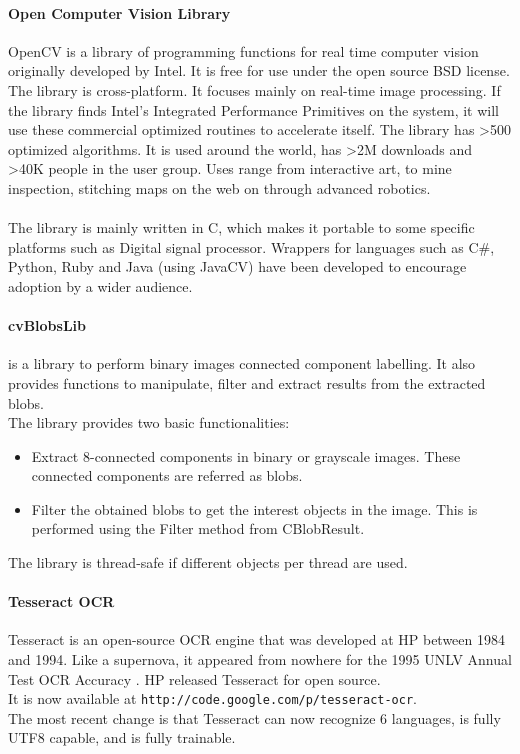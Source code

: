 \documentclass[a4paper,10pt]{iesreport}
\begin{document}
\paragraph*{Open Computer Vision Library}
OpenCV is a library of programming functions for real time computer vision originally developed by Intel.
It is free for use under the open source BSD license. The library is cross-platform. It focuses mainly on real-time image processing. If the library finds Intel's Integrated Performance Primitives on the system, it will use these commercial optimized routines to accelerate itself.
The library has >500 optimized algorithms. It is used around the world, has >2M downloads and >40K people in the user group. Uses range from interactive art, to mine inspection, stitching maps on the web on through advanced robotics.
\paragraph*{}
The library is mainly written in C, which makes it portable to some specific platforms such as Digital signal processor. Wrappers for languages such as C#, Python, Ruby and Java (using JavaCV) have been developed to encourage adoption by a wider audience.
\\
\paragraph*{cvBlobsLib}
is a library to perform binary images connected component labelling. It also provides functions to manipulate, filter and extract results from the extracted blobs.
\\
The library provides two basic functionalities:
\begin{itemize}
 \item Extract 8-connected components in binary or grayscale images. These connected components are referred as blobs.
 \item Filter the obtained blobs to get the interest objects in the image. This is performed using the Filter method from CBlobResult.
\end{itemize}
The library is thread-safe if different objects per thread are used.
\paragraph*{Tesseract OCR}
Tesseract is an open-source OCR engine that was
developed at HP between 1984 and 1994. Like a supernova, it appeared from nowhere for the 1995 UNLV
Annual Test OCR Accuracy \cite{AT}. HP released Tesseract for open source.  \\
It is now available at \texttt{http://code.google.com/p/tesseract-ocr}. \\
The most recent change is that Tesseract can now recognize 6 languages, is fully UTF8 capable, and is fully trainable.
\end{document}
